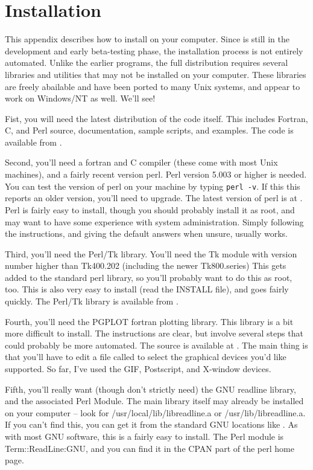 \section{Installation} \label{App:Install}

This appendix describes how to install {\ifeffit} on your computer.  Since
{\ifeffit} is still in the development and early beta-testing phase, the
installation process is not entirely automated.  Unlike the earlier
{\uwxafs} programs, the full {\ifeffit} distribution requires several
libraries and utilities that may not be installed on your computer.  These
libraries are freely abailable and have been ported to many Unix systems,
and appear to work on Windows/NT as well.  We'll see!
 
Fist, you will need the latest distribution of the {\ifeffit} code itself.
This includes Fortran, C, and Perl source, documentation, sample scripts,
and examples.  The code is available from {\WWWiff}. 

Second, you'll need a fortran and C compiler (these come with most Unix
machines), and a fairly recent version perl.  Perl version 5.003 or higher
is needed.  You can test the version of perl on your machine by typing
{\texttt{perl -v}}.  If this this reports an older version, you'll need to
upgrade.  The latest version of perl is at {\WWWperl}.  Perl is fairly easy
to install, though you should probably install it as root, and may want to
have some experience with system administration.  Simply following the
instructions, and giving the default answers when unsure, usually works.

Third, you'll need the Perl/Tk library.  You'll need the Tk module with
version number higher than Tk400.202 (including the newer Tk800.series)
This gets added to the standard perl library, so you'll probably want to do
this as root, too.  This is also very easy to install (read the INSTALL
file), and goes fairly quickly.  The Perl/Tk library is available from
{\WWWperl}.

Fourth, you'll need the PGPLOT fortran plotting library.  This library is a
bit more difficult to install.  The instructions are clear, but involve
several steps that could probably be more automated.  The source is
available at {\WWWpgplot}.  The main thing is that you'll have to edit a
file called {} to select the graphical devices you'd
like supported.  So far, I've used the GIF, Postscript, and X-window
devices.

Fifth, you'll really want (though don't strictly need) the GNU readline
library, and the associated Perl Module.  The main library itself may
already be installed on your computer -- look for
/usr/local/lib/libreadline.a or /usr/lib/libreadline.a.  If you can't find
this, you can get it from the standard GNU locations like
{}.  As
with most GNU software, this is a fairly easy to install.  The 
Perl module is Term::ReadLine:GNU, and you can find it in the CPAN part of
the perl home page.

